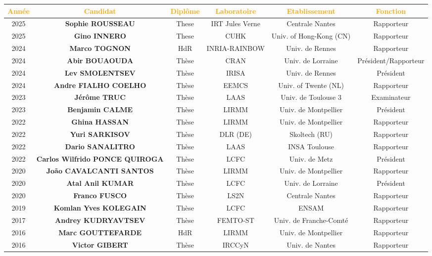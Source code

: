 \documentclass[a4paper,12pt]{article}
\begin{document}
{\centering
\setlength{\tabcolsep}{2pt} %
\begin{tabular}{cccccc} \toprule
    \textcolor{orange}{Année} & \textcolor{orange}{Candidat} & \textcolor{orange}{Diplôme} & \textcolor{orange}{Laboratoire} & \textcolor{orange}{Etablissement} & \textcolor{orange}{Fonction} \\ \midrule
2025 & \bf{Sophie ROUSSEAU} & These & IRT Jules Verne & Centrale Nantes & Rapporteur \\
2025 & \bf{Gino INNERO} & These & CUHK & Univ. of Hong-Kong (CN) & Rapporteur \\
2024 & \bf{Marco TOGNON} & HdR & INRIA-RAINBOW & Univ. de Rennes & Rapporteur \\
2024 & \bf{Abir BOUAOUDA} & Thèse & CRAN & Univ. de Lorraine & Président/Rapporteur \\
2024 & \bf{Lev SMOLENTSEV} & Thèse & IRISA & Univ. de Rennes & Président \\
2024 & \bf{Andre FIALHO COELHO}  & Thèse & EEMCS & Univ. of Twente (NL) & Rapporteur \\
2023 & \bf{Jérôme TRUC}  & Thèse & LAAS & Univ. de Toulouse 3 & Examinateur \\
2023 & \bf{Benjamin CALME}  & Thèse & LIRMM & Univ. de Montpellier & Président \\
2022 & \bf{Ghina HASSAN} & Thèse & LIRMM & Univ. de Montpellier & Rapporteur \\
2022 & \bf{Yuri SARKISOV} & Thèse & DLR (DE) & Skoltech (RU) & Rapporteur \\
2022 & \bf{Dario SANALITRO} & Thèse & LAAS & INSA Toulouse & Rapporteur \\ 
2022 & \bf{Carlos Wilfrido PONCE QUIROGA}  & Thèse & LCFC & Univ. de Metz & Président \\
2020 & \bf{João CAVALCANTI SANTOS}  & Thèse & LIRMM & Univ. de Montpellier & Rapporteur \\ 
2020 & \bf{Atal Anil KUMAR}  & Thèse & LCFC & Univ. de Lorraine & Président \\ 
2020 & \bf{Franco FUSCO}  & Thèse & LS2N & Centrale Nantes & Rapporteur \\ 
2019 & \bf{Komlan Yves KOLEGAIN}  & Thèse & LCFC & ENSAM & Rapporteur \\ 
2017 & \bf{Andrey KUDRYAVTSEV}  & Thèse & FEMTO-ST & Univ. de Franche-Comté & Rapporteur \\
2016 & \bf{Marc GOUTTEFARDE}  & HdR & LIRMM & Univ. de Montpellier & Rapporteur \\
2016 & \bf{Victor GIBERT}  & Thèse & IRCCyN & Univ. de Nantes & Rapporteur \\

\end{tabular}}
\end{document}

